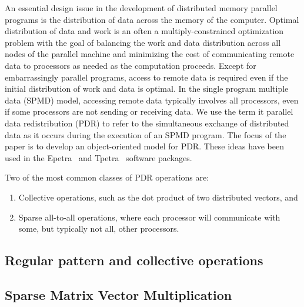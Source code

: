 \documentclass[12pt,relax]{PetraObjectModel}
\begin{document}
An essential design issue in the development of distributed memory parallel programs is the
distribution of data across the memory of the computer.  Optimal distribution of data and work
is an often a multiply-constrained optimization problem with the goal of balancing the work and
data distribution across all nodes of the parallel machine and minimizing the cost of
communicating remote data to processors as needed as the computation proceeds.
Except for embarrassingly parallel programs, access to remote data is required even if
the initial distribution of work and data is optimal.  In the single program multiple data
(SPMD) model, accessing remote data typically involves all processors, even if some processors
are not sending or receiving data.  We use the term {it parallel data
redistribution (PDR)} to refer to the simultaneous exchange of distributed data as it occurs during
the execution of an SPMD program.  The focus of the paper is to develop an object-oriented
model for PDR.  These ideas have been used in the Epetra~\cite{Epetra-User-Guide} and
Tpetra~\cite{Tpetra-User-Guide} software packages.

Two of the most common classes of PDR operations are:
\begin{enumerate}
\item Collective operations, such as the dot
product of two distributed vectors, and 
\item Sparse all-to-all operations, where each processor will
communicate with some, but typically not all, other processors.
\end{enumerate}


\subsection{Regular pattern and collective operations}

\subsection{Sparse Matrix Vector Multiplication}
\end{document}
